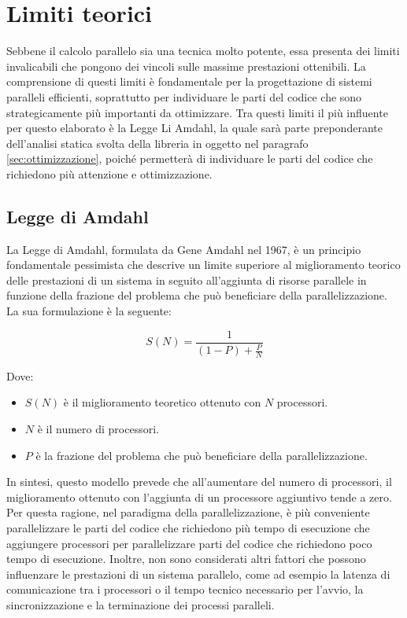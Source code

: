 \section{Limiti teorici}
\label{sec:limititeorici}

Sebbene il calcolo parallelo sia una tecnica molto potente, essa presenta dei limiti
invalicabili che pongono dei vincoli sulle massime prestazioni ottenibili. La
comprensione di questi limiti è fondamentale per la progettazione di sistemi
paralleli efficienti, soprattutto per individuare le parti del codice che sono strategicamente
più importanti da ottimizzare. Tra questi limiti il più influente per questo
elaborato è la Legge Li Amdahl, la quale sarà parte preponderante dell'analisi statica
svolta della libreria in oggetto nel paragrafo \ref{sec:ottimizzazione}, poiché
permetterà di individuare le parti del codice che richiedono più attenzione e
ottimizzazione.

\subsection{Legge di Amdahl}
\label{sec:amdahl}

La Legge di Amdahl, formulata da Gene Amdahl nel 1967, è un principio fondamentale
pessimista che descrive un limite superiore al miglioramento teorico delle prestazioni
di un sistema in seguito all'aggiunta di risorse parallele in funzione della frazione
del problema che può beneficiare della parallelizzazione. La sua formulazione è
la seguente:

\begin{equation}
  S(N) = \frac{1}{(1 - P) + \frac{P}{N}}
\end{equation}

Dove:
\begin{itemize}
  \item $S(N)$ è il miglioramento teoretico ottenuto con $N$ processori.

  \item $N$ è il numero di processori.

  \item $P$ è la frazione del problema che può beneficiare della parallelizzazione.
\end{itemize}

In sintesi, questo modello prevede che all'aumentare del numero di processori, il
miglioramento ottenuto con l'aggiunta di un processore aggiuntivo tende a zero.
Per questa ragione, nel paradigma della parallelizzazione, è più conveniente
parallelizzare le parti del codice che richiedono più tempo di esecuzione che
aggiungere processori per parallelizzare parti del codice che richiedono poco
tempo di esecuzione. Inoltre, non sono considerati altri fattori che possono
influenzare le prestazioni di un sistema parallelo, come ad esempio la latenza di
comunicazione tra i processori o il tempo tecnico necessario per l'avvio, la
sincronizzazione e la terminazione dei processi paralleli.